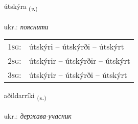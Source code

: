 \documentclass[frontgrid, backgrid]{flacards}\usepackage[]{graphicx}\usepackage[]{xcolor}
\begin{document}
\renewcommand{\flhead}{\vskip5pt \fboxsep=0pt {\small\bfseries\footnotesize Sagnorð | дієслово}}
\renewcommand{\fcfoot}{\vskip5pt \fboxsep=0pt \hspace{2pt}{\small\bfseries\footnotesize 2K}}

\renewcommand{\blhead}{\vskip5pt {\small\bfseries\footnotesize Sagnorð | дієслово }}
\renewcommand{\bcfoot}{\vskip5pt \hspace{2pt}{\small\bfseries\footnotesize 2K}}


{útskýra \small{\textsubscript{(\textit{v.})}} \\[1ex] %
\textphonetic{[uːtscira]} \\
ukr.: \emph{пояснити} \\  [2ex]
\renewcommand*{\arraystretch}{0.8}
\begin{tabular}{p{1cm}l}
\textsc{1sg}: & útskýri -- útskýrði -- útskýrt \\ 
\textsc{2sg}: & útskýrir -- útskýrðir -- útskýrt \\ 
\textsc{3sg}: & útskýrir -- útskýrði -- útskýrt \\ 
\end{tabular}
}

\renewcommand{\flhead}{\vskip5pt \fboxsep=0pt {\small\bfseries\footnotesize Nafnorð | іменник}}
\renewcommand{\fcfoot}{\vskip5pt \fboxsep=0pt \hspace{2pt}{\small\bfseries\footnotesize 2K}}

\renewcommand{\blhead}{\vskip5pt {\small\bfseries\footnotesize Nafnorð | іменник }}
\renewcommand{\bcfoot}{\vskip5pt \hspace{2pt}{\small\bfseries\footnotesize 2K}}


{aðildarríki \small{\textsubscript{(\textit{n.})}} \\[1ex] %
\textphonetic{[aːðɪltaricɪ]} \\
ukr.: \emph{держава-учасник} \\  [2ex]
\renewcommand*{\arraystretch}{0.8}
}
\end{document}
